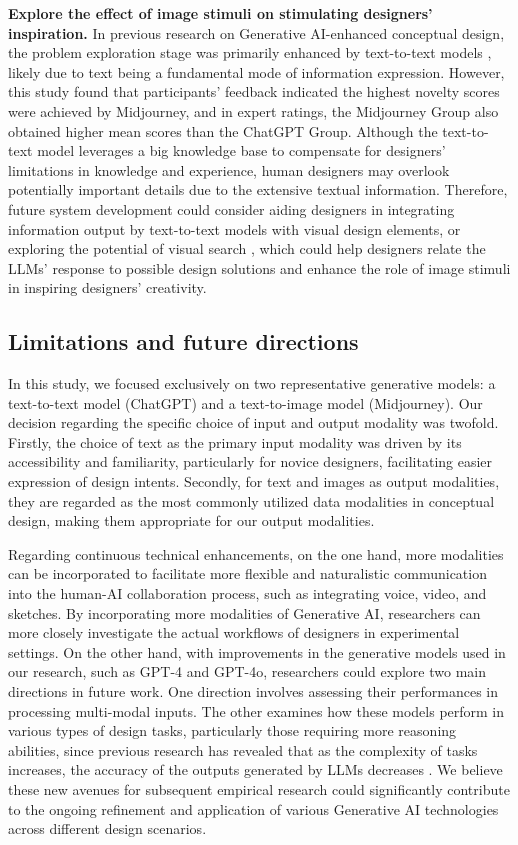 \documentclass{dsj}
\begin{document}
\textbf{Explore the effect of image stimuli on stimulating designers' inspiration.} In previous research on Generative AI-enhanced conceptual design, the problem exploration stage was primarily enhanced by text-to-text models \citep{norheim2024challenges}, likely due to text being a fundamental mode of information expression. However, this study found that participants’ feedback indicated the highest novelty scores were achieved by Midjourney, and in expert ratings, the Midjourney Group also obtained higher mean scores than the ChatGPT Group. Although the text-to-text model leverages a big knowledge base to compensate for designers' limitations in knowledge and experience, human designers may overlook potentially important details due to the extensive textual information. Therefore, future system development could consider aiding designers in integrating information output by text-to-text models with visual design elements, or exploring the potential of visual search \citep{son2024genquery}, which could help designers relate the LLMs’ response to possible design solutions and enhance the role of image stimuli in inspiring designers’ creativity. 

\subsection{Limitations and future directions}
In this study, we focused exclusively on two representative generative models: a text-to-text model (ChatGPT) and a text-to-image model (Midjourney). Our decision regarding the specific choice of input and output modality was twofold. Firstly, the choice of text as the primary input modality was driven by its accessibility and familiarity, particularly for novice designers, facilitating easier expression of design intents. Secondly, for text and images as output modalities, they are regarded as the most commonly utilized data modalities in conceptual design, making them appropriate for our output modalities. 

Regarding continuous technical enhancements, on the one hand, more modalities can be incorporated to facilitate more flexible and naturalistic communication into the human-AI collaboration process, such as integrating voice, video, and sketches. By incorporating more modalities of Generative AI, researchers can more closely investigate the actual workflows of designers in experimental settings. On the other hand, with improvements in the generative models used in our research, such as GPT-4 and GPT-4o, researchers could explore two main directions in future work. One direction involves assessing their performances in processing multi-modal inputs. The other examines how these models perform in various types of design tasks, particularly those requiring more reasoning abilities, since previous research has revealed that as the complexity of tasks increases, the accuracy of the outputs generated by LLMs decreases \citep{khot2023decomposed}. We believe these new avenues for subsequent empirical research could significantly contribute to the ongoing refinement and application of various Generative AI technologies across different design scenarios.
\end{document}
